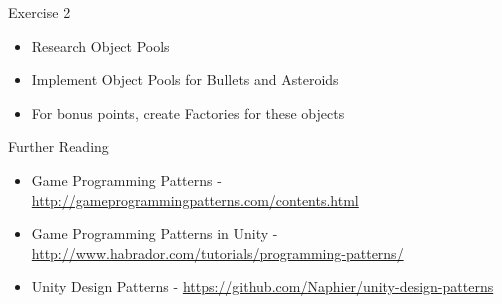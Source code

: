 \begin{frame}{Exercise 2}
	\begin{itemize}
		\item Research Object Pools
		\item Implement Object Pools for Bullets and Asteroids
		\item For bonus points, create Factories for these objects 
	\end{itemize}
\end{frame}

\begin{frame}{Further Reading}
	\begin{itemize}
		\item Game Programming Patterns - \url{http://gameprogrammingpatterns.com/contents.html}
		\item Game Programming Patterns in Unity - \url{http://www.habrador.com/tutorials/programming-patterns/}
		\item Unity Design Patterns - \url{https://github.com/Naphier/unity-design-patterns}
	\end{itemize}
\end{frame}
